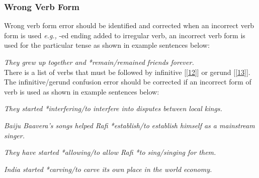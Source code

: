 \documentclass[12pt]{article}
\begin{document}





\subsubsection{Wrong Verb Form}
Wrong verb form error should be identified and corrected when an incorrect verb form is used {\it e.g.,} -ed ending added to irregular verb, an incorrect verb form is used for the particular tense as shown in example sentences below:

{\it They grew up together and *remain/remained friends forever.}\\



There is a list of verbs that must be followed by infinitive [\ref{12}] or gerund [\ref{13}]. The infinitive/gerund confusion error should be corrected if an incorrect form of verb is used as shown in example sentences below:

{\it They started *interfering/to interfere into disputes between local kings.}

{\it Baiju Baavera's songs helped Rafi *establish/to establish himself as a mainstream singer.}

{\it They have started *allowing/to allow Rafi *to sing/singing for them.}

{\it India started *carving/to carve its own place in the world economy.}


\end{document}
